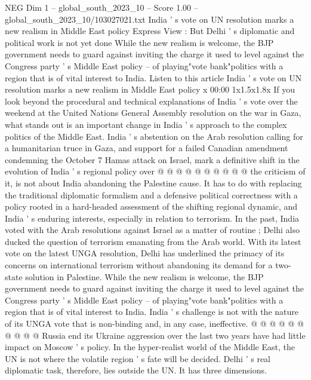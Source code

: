 \begin{textsample}{NEG Dim 1 – global\_south\_2023\_10 – Score 1.00 – global\_south\_2023\_10/103027021.txt}  \label{ex:f1_neg_259}
India ' s vote on UN resolution marks a new realism in Middle East policy Express View : But Delhi ' s diplomatic and political work is not yet done While the new realism is welcome, the BJP government needs to guard against inviting the charge it used to level against the Congress party ' s Middle East policy -- of playing"vote bank"politics with a region that is of vital interest to India.
Listen to this article India ' s vote on UN resolution marks a new realism in Middle East policy x 00:00 1x1.5x1.8x If you look beyond the procedural and technical explanations of India ' s vote over the weekend at the United Nations General Assembly resolution on the war in Gaza, what stands out is an important change in India ' s approach to the complex politics of the Middle East.
India ' s abstention on the Arab resolution calling for a humanitarian truce in Gaza, and support for a failed Canadian amendment condemning the October 7 Hamas attack on Israel, mark a definitive shift in the evolution of India ' s regional policy over @ @ @ @ @ @ @ @ @ @ the criticism of it, is not about India abandoning the Palestine cause.
It has to do with replacing the traditional diplomatic formalism and a defensive political correctness with a policy rooted in a hard-headed assessment of the shifting regional dynamic, and India ' s enduring interests, especially in relation to terrorism.
In the past, India voted with the Arab resolutions against Israel as a matter of routine ; Delhi also ducked the question of terrorism emanating from the Arab world.
With its latest vote on the latest UNGA resolution, Delhi has underlined the primacy of its concerns on international terrorism without abandoning its demand for a two-state solution in Palestine.
While the new realism is welcome, the BJP government needs to guard against inviting the charge it used to level against the Congress party ' s Middle East policy -- of playing"vote bank"politics with a region that is of vital interest to India.
India ' s challenge is not with the nature of its UNGA vote that is non-binding and, in any case, ineffective. @ @ @ @ @ @ @ @ @ @ Russia end its Ukraine aggression over the last two years have had little impact on Moscow ' s policy.
In the hyper-realist world of the Middle East, the UN is not where the volatile region ' s fate will be decided.
Delhi ' s real diplomatic task, therefore, lies outside the UN.
It has three dimensions.

\end{textsample}
